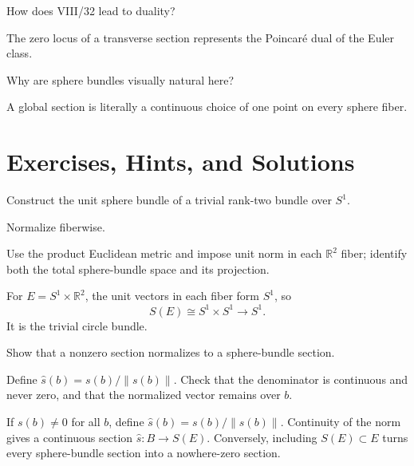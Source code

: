 \begin{problem}
How does VIII/32 lead to duality?
\end{problem}
\begin{solution}
The zero locus of a transverse section represents the Poincaré dual of the Euler class.
\end{solution}

\begin{problem}
Why are sphere bundles visually natural here?
\end{problem}
\begin{solution}
A global section is literally a continuous choice of one point on every sphere fiber.
\end{solution}

\section{Exercises, Hints, and Solutions}
\begin{exercise}\label{exr:viii32-01}
Construct the unit sphere bundle of a trivial rank-two bundle over $S^1$.
\end{exercise}
\begin{hint}
Normalize fiberwise.

Use the product Euclidean metric and impose unit norm in each \(\mathbb R^2\) fiber; identify both the total sphere-bundle space and its projection.
\end{hint}
\begin{solution}
For \(E=S^1\times\mathbb R^2\), the unit vectors in each fiber form \(S^1\), so
\[
S(E)\cong S^1\times S^1\to S^1.
\]
It is the trivial circle bundle.
\end{solution}

\begin{exercise}\label{exr:viii32-02}
Show that a nonzero section normalizes to a sphere-bundle section.
\end{exercise}
\begin{hint}
Define \(\widehat s(b)=s(b)/\|s(b)\|\). Check that the denominator is continuous and never zero, and that the normalized vector remains over \(b\).
\end{hint}
\begin{solution}
If \(s(b)\ne0\) for all \(b\), define \(\widehat s(b)=s(b)/\|s(b)\|\). Continuity of the norm gives a continuous section \(\widehat s:B\to S(E)\). Conversely, including \(S(E)\subset E\) turns every sphere-bundle section into a nowhere-zero section.
\end{solution}

